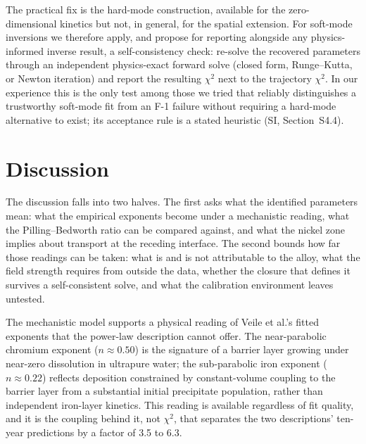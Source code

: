 \documentclass[a4paper,fleqn]{cas-sc}
\begin{document}
The practical fix is the hard-mode construction, available for the
zero-dimensional kinetics but not, in general, for the spatial
extension. For soft-mode inversions we therefore apply, and propose for
reporting alongside any physics-informed inverse result, a
self-consistency check: re-solve the recovered parameters through an
independent physics-exact forward solve (closed form, Runge--Kutta, or
Newton iteration) and report the resulting $\chi^2$ next to the
trajectory $\chi^2$. In our experience this is the only test among
those we tried that reliably distinguishes a trustworthy soft-mode fit
from an F-1 failure without requiring a hard-mode alternative to exist;
its acceptance rule is a stated heuristic (SI, Section~S4.4).


\section{Discussion}\label{sec:discussion}

The discussion falls into two halves. The first asks what the identified
parameters mean: what the empirical exponents become under a
mechanistic reading, what the Pilling--Bedworth ratio can be compared
against, and what the nickel zone implies about transport at the
receding interface. The second bounds how far those readings can be
taken: what is and is not attributable to the alloy, what the field
strength requires from outside the data, whether the closure that
defines it survives a self-consistent solve, and what the calibration
environment leaves untested.

The mechanistic model supports a physical reading of Veile et al.'s
fitted exponents that the power-law description cannot offer. The
near-parabolic chromium exponent ($n \approx 0.50$) is the signature of
a barrier layer growing under near-zero dissolution in ultrapure water;
the sub-parabolic iron exponent ($n \approx 0.22$) reflects deposition
constrained by constant-volume coupling to the barrier layer from a
substantial initial precipitate population, rather than independent
iron-layer kinetics. This reading is available regardless of fit
quality, and it is the coupling behind it, not $\chi^2$, that separates
the two descriptions' ten-year predictions by a factor of 3.5 to 6.3.
\end{document}
